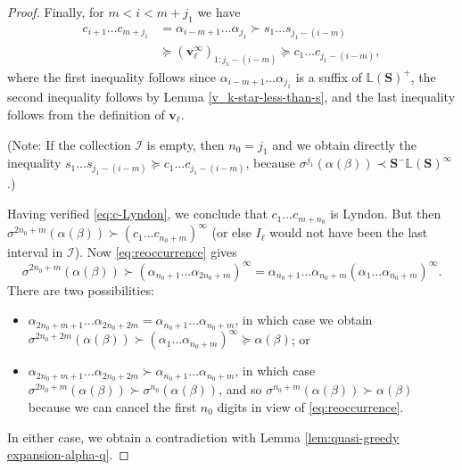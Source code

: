 \documentclass[11pt]{amsart}
\theoremstyle{definition}
\theoremstyle{remark}
\numberwithin{equation}{section}
\renewcommand{\L}{\ensuremath{\mathbb{L}}}
\newcommand{\II}{\mathcal{I}}
\newcommand{\cs}{ {\mathbf{S}}}
\renewcommand{\v}{\mathbf{v}}
\newcommand{\f}{\infty}
\newcommand{\al}{\alpha}
\newcommand{\lge}{\succcurlyeq}
\newcommand{\si}{\sigma}
\begin{document}
{\begin{proof}

Finally, for $m<i<m+j_1$ we have
\begin{align*}
c_{i+1}\dots c_{m+j_1}&=\al_{i-m+1}\dots \al_{j_1}\succ s_1\dots s_{j_1-(i-m)}\\
&\lge (\v_{\ell}^\f)_{1:j_1-(i-m)}\lge c_1\dots c_{j_1-(i-m)},
\end{align*}
where the first inequality follows since $\al_{i-m+1}\dots \al_{j_1}$ is a suffix of $\L(\cs)^+$, the second inequality follows by Lemma \ref{v_k-star-less-than-s}, and the last inequality follows from the definition of $\v_{\ell}$.

(Note: If the collection $\II$ is empty, then $n_0=j_1$ and we obtain directly the inequality $s_1\dots s_{j_1-(i-m)}\lge c_1\dots c_{j_1-(i-m)}$, because $\si^{j_1}(\al(\beta))\prec \cs^-\L(\cs)^\f$.)


Having verified \eqref{eq:c-Lyndon}, we conclude that $c_1\dots c_{m+n_0}$ is Lyndon. But then $\si^{2n_0+m}(\al(\beta))\succ (c_1\dots c_{n_0+m})^\f$ {(or else $I_{\ell}$ would not have been the last interval in $\II$)}. Now \eqref{eq:reoccurrence} gives
\[
\si^{2n_0+m}(\al(\beta))\succ (\al_{n_0+1}\dots \al_{2n_0+m})^\f=\al_{n_0+1}\dots\al_{n_0+m}(\al_1\dots\al_{n_0+m})^\f.
\]
There are two possibilities:
\begin{itemize}
\item $\al_{2n_0+m+1}\dots\al_{2n_0+2m}=\al_{n_0+1}\dots\al_{n_0+m}$, in which case we obtain $\si^{2n_0+2m}(\al(\beta))\succ (\al_1\dots\al_{n_0+m})^\f\lge \al(\beta)$; or 
\item $\al_{2n_0+m+1}\dots\al_{2n_0+2m}\succ\al_{n_0+1}\dots\al_{n_0+m}$, in which case $\si^{2n_0+m}(\al(\beta))\succ\si^{n_0}(\al(\beta))$, and so $\si^{n_0+m}(\al(\beta))\succ\al(\beta)$ because we can cancel the first $n_0$ digits in view of \eqref{eq:reoccurrence}. 
\end{itemize}
In either case, we obtain a contradiction with Lemma \ref{lem:quasi-greedy expansion-alpha-q}.
\end{proof}
}
\end{document}
